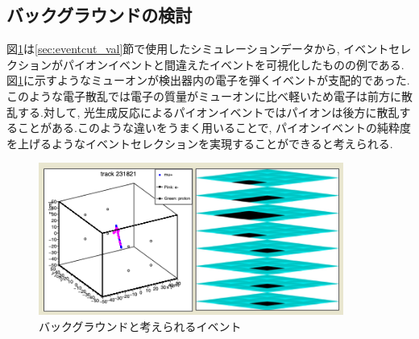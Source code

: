 \subsection{バックグラウンドの検討}\label{sec:anal:background}
図\ref{fig:anal:bg01}は\ref{sec:eventcut_val}節で使用したシミュレーションデータから, イベントセレクションがパイオンイベントと間違えたイベントを可視化したものの例である.図\ref{fig:anal:bg01}に示すようなミューオンが検出器内の電子を弾くイベントが支配的であった.このような電子散乱では電子の質量がミューオンに比べ軽いため電子は前方に散乱する.対して, 光生成反応によるパイオンイベントではパイオンは後方に散乱することがある.このような違いをうまく用いることで, パイオンイベントの純粋度を上げるようなイベントセレクションを実現することができると考えられる.
\begin{figure}[H]
    \centering
    \includegraphics[height=5.0cm]{img/anal_bg01.png}
    \caption{バックグラウンドと考えられるイベント}
    \label{fig:anal:bg01}
\end{figure}